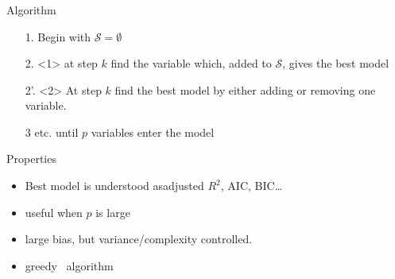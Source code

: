 \documentclass[10pt, c, xcolor=x11names]{beamer}\usepackage[]{graphicx}\usepackage[]{color}
\begin{document}
\begin{frame}
  \frametitle{ }

  \begin{block}{Algorithm}
    \begin{itemize}
    \item[1.] Begin with $\mathcal{S} = \emptyset$
    \item[2.]<1> at step $k$ find the variable which, added to $\mathcal{S}$, 
      gives the best model
    \item[2'.]<2> At step $k$ find the best model by either adding or removing one variable.
    \item[3] etc. until $p$ variables enter the model
      
    \end{itemize}
  \end{block}
  
  \vfill
  
  \begin{block}{Properties}
    \begin{itemize}
    \item Best model is understood asadjusted $R^2$, AIC, BIC\dots
    \item useful when $p$ is large
    \item large bias, but variance/complexity controlled.
    \item \og greedy \fg\ algorithm
    \end{itemize}
  \end{block}

\end{frame}

% 
%   
%   
% 
% 
 
\end{document}
